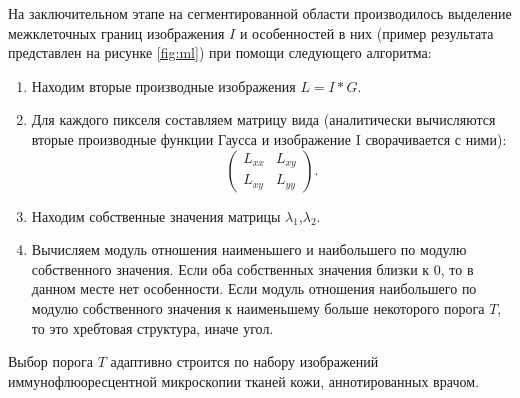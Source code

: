 На заключительном этапе на сегментированной области производилось выделение межклеточных границ изображения $I$ и особенностей в них (пример результата представлен на рисунке  \ref{fig:ml}) при помощи следующего алгоритма:

\begin {enumerate}
		\item	Находим вторые производные изображения $L = I * G$.
		\item	Для каждого пикселя составляем матрицу вида (аналитически вычисляются вторые производные функции Гаусса и изображение I сворачивается с ними): \[\begin{pmatrix} L_{xx} & L_{xy} \\ L_{xy} & L_{yy} \end{pmatrix}.\] 
		\item	Находим собственные значения матрицы $\lambda_1$,$\lambda_2$.
		\item	Вычисляем модуль отношения наименьшего и наибольшего по модулю собственного значения. Если оба собственных значения близки к $0$, то в данном месте нет особенности. Если модуль отношения наибольшего по модулю собственного значения к наименьшему больше некоторого порога $T$, то это хребтовая структура, иначе угол.
\end {enumerate}

\noindent Выбор порога $T$ адаптивно строится по набору изображений иммунофлюоресцентной микроскопии тканей кожи, аннотированных врачом. 


